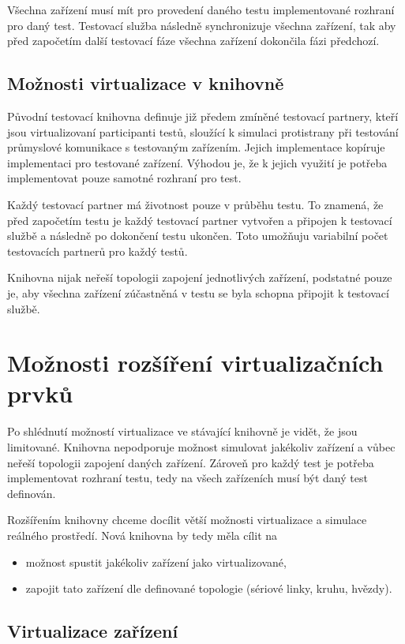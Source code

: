 Všechna zařízení musí mít pro provedení daného testu implementované rozhraní pro daný test. Testovací služba následně synchronizuje všechna zařízení, tak aby před započetím další testovací fáze všechna zařízení dokončila fázi předchozí. 

\subsection{Možnosti virtualizace v knihovně}

Původní testovací knihovna definuje již předem zmíněné testovací partnery, kteří jsou virtualizovaní participanti testů, sloužící k simulaci protistrany při testování průmyslové komunikace s testovaným zařízením. Jejich implementace kopíruje implementaci pro testované zařízení. Výhodou je, že k jejich využití je potřeba implementovat pouze samotné rozhraní pro test.

Každý testovací partner má životnost pouze v průběhu testu. To znamená, že před započetím testu je každý testovací partner vytvořen a připojen k testovací službě a následně po dokončení testu ukončen. Toto umožňuju variabilní počet testovacích partnerů pro každý testů.

Knihovna nijak neřeší topologii zapojení jednotlivých zařízení, podstatné pouze je, aby všechna zařízení zúčastněná v testu se byla schopna připojit k testovací službě. 


\section{Možnosti rozšíření virtualizačních prvků}

Po shlédnutí možností virtualizace ve stávající knihovně je vidět, že jsou limitované. Knihovna nepodporuje možnost simulovat jakékoliv zařízení a vůbec neřeší topologii zapojení daných zařízení. Zároveň pro každý test je potřeba implementovat rozhraní testu, tedy na všech zařízeních musí být daný test definován. 

Rozšířením knihovny chceme docílit větší možnosti virtualizace a simulace reálného prostředí. Nová knihovna by tedy měla cílit na

\begin{itemize}
    \item možnost spustit jakékoliv zařízení jako virtualizované,
    \item zapojit tato zařízení dle definované topologie (sériové linky, kruhu, hvězdy).
\end{itemize}


\subsection{Virtualizace zařízení}

